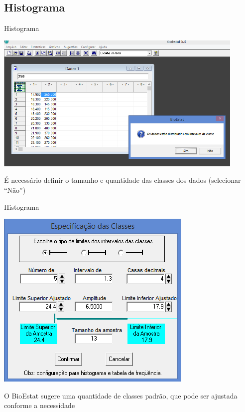 \documentclass{beamer}
\begin{document}
\subsection{Histograma}

\begin{frame}{Histograma}
  \begin{center}
    \includegraphics[width=0.9\textwidth]{Pratica_Desc/histograma1}
  \end{center}

  É necessário definir o tamanho e quantidade das classes dos dados
  (selecionar ``Não'')
\end{frame}


\begin{frame}{Histograma}
  \begin{center}
    \includegraphics[height=0.7\textheight]{Pratica_Desc/histograma2}
  \end{center}

  O BioEstat sugere uma quantidade de classes padrão, que pode ser
  ajustada conforme a necessidade
\end{frame}
\end{document}
